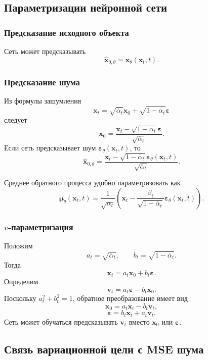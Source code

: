 \documentclass[12pt,a4paper]{article}
\theoremstyle{definition}
\newcommand{\eps}{\varepsilon}
\newcommand{\1}{\mathbf{1}}
\begin{document}
\subsection{Параметризации нейронной сети}

\subsubsection{Предсказание исходного объекта}

Сеть может предсказывать
\[
    \widehat{\bm{x}}_{0,\theta}
    =
    \bm{x}_\theta(\bm{x}_t,t).
\]

\subsubsection{Предсказание шума}

Из формулы зашумления
\[
    \bm{x}_t
    =
    \sqrt{\overline{\alpha}_t}\bm{x}_0
    +
    \sqrt{1-\overline{\alpha}_t}\bm{\eps}
\]
следует
\[
    \bm{x}_0
    =
    \frac{
        \bm{x}_t
        -
        \sqrt{1-\overline{\alpha}_t}\bm{\eps}
    }{
        \sqrt{\overline{\alpha}_t}
    }.
\]
Если сеть предсказывает шум
$\bm{\eps}_\theta(\bm{x}_t,t)$, то
\[
    \widehat{\bm{x}}_{0,\theta}
    =
    \frac{
        \bm{x}_t
        -
        \sqrt{1-\overline{\alpha}_t}
        \bm{\eps}_\theta(\bm{x}_t,t)
    }{
        \sqrt{\overline{\alpha}_t}
    }.
\]

Среднее обратного процесса удобно параметризовать как
\[
    \bm{\mu}_\theta(\bm{x}_t,t)
    =
    \frac{1}{\sqrt{\alpha_t}}
    \left(
        \bm{x}_t
        -
        \frac{\beta_t}
             {\sqrt{1-\overline{\alpha}_t}}
        \bm{\eps}_\theta(\bm{x}_t,t)
    \right).
\]

\subsubsection{\(v\)-параметризация}

Положим
\[
    a_t=\sqrt{\overline{\alpha}_t},
    \qquad
    b_t=\sqrt{1-\overline{\alpha}_t}.
\]
Тогда
\[
    \bm{x}_t=a_t\bm{x}_0+b_t\bm{\eps}.
\]
Определим
\[
    \bm{v}_t=a_t\bm{\eps}-b_t\bm{x}_0.
\]
Поскольку $a_t^2+b_t^2=1$, обратное преобразование имеет вид
\[
    \bm{x}_0=a_t\bm{x}_t-b_t\bm{v}_t,
\]
\[
    \bm{\eps}=b_t\bm{x}_t+a_t\bm{v}_t.
\]
Сеть может обучаться предсказывать $\bm{v}_t$ вместо
$\bm{x}_0$ или $\bm{\eps}$.

\subsection{Связь вариационной цели с MSE шума}
\end{document}
